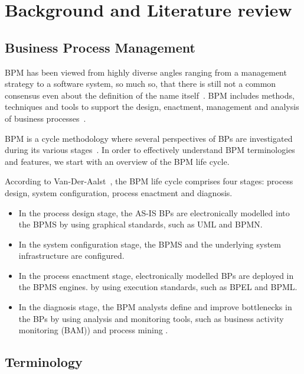 \chapter{Background and Literature review}

\section{Business Process Management}

BPM has been viewed from highly diverse angles ranging from a management strategy to a software system, so much so, that there is still not a common consensus even about the definition of the name itself~\cite{van2003workflow}. BPM includes methods, techniques and tools to support the design, enactment, management and analysis of business processes~\cite{van2003workflow}.

BPM is a cycle methodology where several perspectives of BPs are investigated during its various stages~\cite{lodhi2013business}. In order to effectively understand BPM terminologies and features, we start with an overview of the BPM life cycle.

According to Van-Der-Aalst~\cite{van2003workflow}, the BPM life cycle comprises four
stages: process design, system configuration, process enactment and diagnosis.
\begin{itemize}
    \item In the process design stage, the AS-IS BPs are electronically modelled into the BPMS by using graphical standards, such as UML and BPMN.
    \item In the system configuration stage, the BPMS and the underlying system infrastructure are configured. 
    \item In the process enactment stage, electronically modelled BPs are deployed in the BPMS engines. by using execution standards, such as BPEL and BPML.
    \item In the diagnosis stage, the BPM analysts define and improve bottlenecks in the BPs by using analysis and monitoring tools, such as business activity monitoring (BAM)) and process mining .
\end{itemize}

\section{Terminology}

